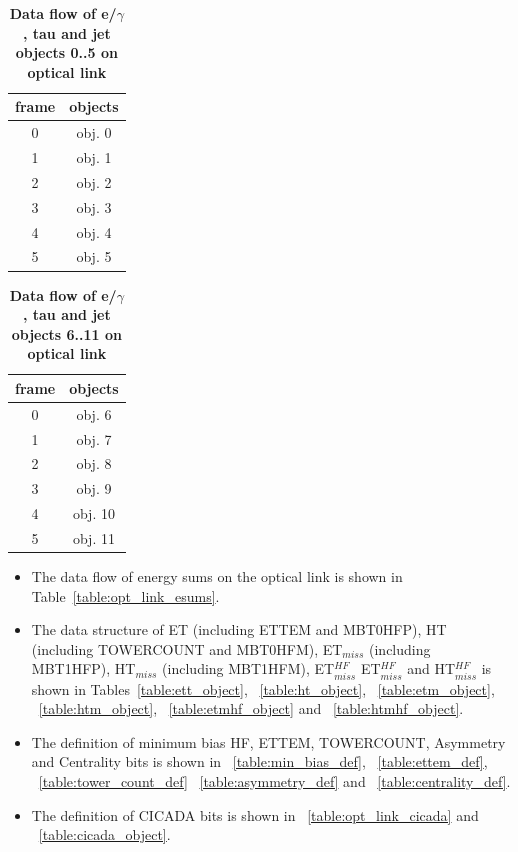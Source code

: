 \documentclass{cmspaper}
\begin{document}
\begin{table}[ht]
\caption{\bf Data flow of e/$\gamma$, tau and jet objects 0..5 on optical link}
\vspace{5mm}
\centering
\begin{tabular}{|c|c|}\hline
frame & objects\\\hline\hline
0 & obj. 0 \\\hline
1 & obj. 1 \\\hline
2 & obj. 2 \\\hline
3 & obj. 3 \\\hline
4 & obj. 4 \\\hline
5 & obj. 5 \\\hline
\end{tabular}
\label{table:opt_link_egamma_obj_0_5}
\end{table}

\begin{table}[ht]
\caption{\bf Data flow of e/$\gamma$, tau and jet objects 6..11 on optical link}
\vspace{5mm}
\centering
\begin{tabular}{|c|c|}\hline
frame & objects\\\hline\hline
0 & obj. 6 \\\hline
1 & obj. 7 \\\hline
2 & obj. 8 \\\hline
3 & obj. 9 \\\hline
4 & obj. 10 \\\hline
5 & obj. 11 \\\hline
\end{tabular}
\label{table:opt_link_egamma_obj_6_11}
\end{table}

\clearpage

\begin{itemize}
\item The data flow of energy sums on the optical link is shown in Table~\ref{table:opt_link_esums}.
\item The data structure of ET (including ETTEM and MBT0HFP), HT (including TOWERCOUNT and MBT0HFM), ET$_{miss}$ (including MBT1HFP), HT$_{miss}$ (including MBT1HFM), ET$_{miss}^{HF}$    ET$_{miss}^{HF}$
and HT$_{miss}^{HF}$
is shown in Tables~\ref{table:ett_object}, ~\ref{table:ht_object}, ~\ref{table:etm_object}, ~\ref{table:htm_object}, ~\ref{table:etmhf_object} and ~\ref{table:htmhf_object}.
\item The definition of minimum bias HF, ETTEM, TOWERCOUNT, Asymmetry and Centrality bits is shown in ~\ref{table:min_bias_def}, ~\ref{table:ettem_def}, ~\ref{table:tower_count_def}
~\ref{table:asymmetry_def} and ~\ref{table:centrality_def}.
\item The definition of CICADA bits is shown in ~\ref{table:opt_link_cicada} and ~\ref{table:cicada_object}.
\end{itemize}
\end{document}
